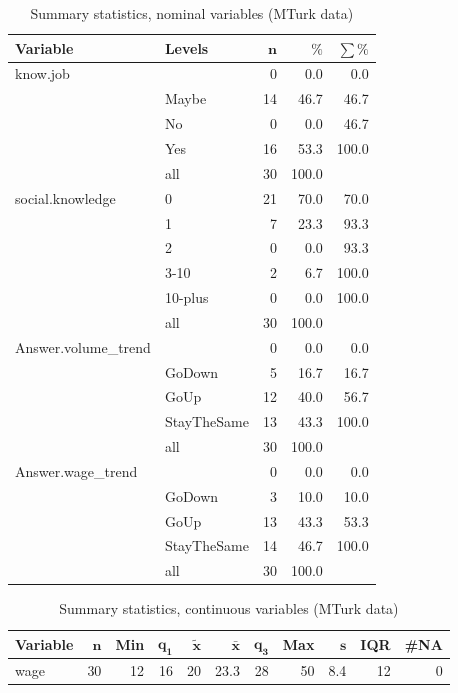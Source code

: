 \documentclass[a4paper,10pt]{article}\usepackage[]{graphicx}\usepackage[]{color}
\begin{document}
\begin{table}[ht]
\centering
{\footnotesize
\begin{tabular}{ll|rrr}
 \textbf{Variable} & \textbf{Levels} & $\mathbf{n}$ & $\mathbf{\%}$ & $\mathbf{\sum \%}$ \\ 
  \hline
know.job &  & 0 & 0.0 & 0.0 \\ 
   & Maybe & 14 & 46.7 & 46.7 \\ 
   & No & 0 & 0.0 & 46.7 \\ 
   & Yes & 16 & 53.3 & 100.0 \\ 
   \hline
 & all & 30 & 100.0 &  \\ 
   \hline
\hline
social.knowledge & 0 & 21 & 70.0 & 70.0 \\ 
   & 1 & 7 & 23.3 & 93.3 \\ 
   & 2 & 0 & 0.0 & 93.3 \\ 
   & 3-10 & 2 & 6.7 & 100.0 \\ 
   & 10-plus & 0 & 0.0 & 100.0 \\ 
   \hline
 & all & 30 & 100.0 &  \\ 
   \hline
\hline
Answer.volume\_trend &  & 0 & 0.0 & 0.0 \\ 
   & GoDown & 5 & 16.7 & 16.7 \\ 
   & GoUp & 12 & 40.0 & 56.7 \\ 
   & StayTheSame & 13 & 43.3 & 100.0 \\ 
   \hline
 & all & 30 & 100.0 &  \\ 
   \hline
\hline
Answer.wage\_trend &  & 0 & 0.0 & 0.0 \\ 
   & GoDown & 3 & 10.0 & 10.0 \\ 
   & GoUp & 13 & 43.3 & 53.3 \\ 
   & StayTheSame & 14 & 46.7 & 100.0 \\ 
   \hline
 & all & 30 & 100.0 &  \\ 
   \hline
\hline
\end{tabular}
}
\caption{Summary statistics, nominal variables (MTurk data)} 
\label{tab1:27-1020}
\end{table}
\begin{table}[ht]
\centering
{\footnotesize
\begin{tabular}{lrrrrrrrrrr}
 \textbf{Variable} & $\mathbf{n}$ & \textbf{Min} & $\mathbf{q_1}$ & $\mathbf{\widetilde{x}}$ & $\mathbf{\bar{x}}$ & $\mathbf{q_3}$ & \textbf{Max} & $\mathbf{s}$ & \textbf{IQR} & \textbf{\#NA} \\ 
  \hline
wage & 30 & 12 & 16 & 20 & 23.3 & 28 & 50 & 8.4 & 12 & 0 \\ 
  \end{tabular}
}
\caption{Summary statistics, continuous variables (MTurk data)} 
\label{tab2:27-1020}
\end{table}
\end{document}
